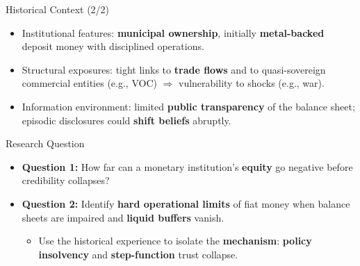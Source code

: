 \documentclass[aspectratio=169, xcolor=table]{beamer}
\begin{document}
\begin{frame}{Historical Context (2/2)}
  \begin{itemize}
    \item Institutional features: \textbf{municipal ownership}, initially \textbf{metal-backed} deposit money with disciplined operations.
    \item Structural exposures: tight links to \textbf{trade flows} and to quasi-sovereign commercial entities (e.g., VOC) $\Rightarrow$ vulnerability to shocks (e.g., war).
    \item Information environment: limited \textbf{public transparency} of the balance sheet; episodic disclosures could \textbf{shift beliefs} abruptly.
  \end{itemize}
\end{frame}


\begin{frame}{Research Question}
  \begin{itemize}
    \item \textbf{Question 1:} How far can a monetary institution's \textbf{equity} go negative before credibility collapses?
    \item \textbf{Question 2:} Identify \textbf{hard operational limits} of fiat money when balance sheets are impaired and \textbf{liquid buffers} vanish.
          \begin{itemize}
            \item Use the historical experience to isolate the \textbf{mechanism}: \textbf{policy insolvency} and \textbf{step-function} trust collapse.
          \end{itemize}
  \end{itemize}
\end{frame}
\end{document}
